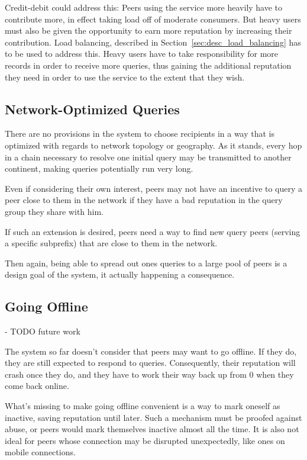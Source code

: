 Credit-debit could address this: Peers using the service more heavily have to
contribute more, in effect taking load off of moderate consumers. But heavy
users must also be given the opportunity to earn more reputation by increasing
their contribution. Load balancing, described in
Section~\ref{sec:desc_load_balancing} has to be used to address this. Heavy
users have to take responsibility for more records in order to receive more
queries, thus gaining the additional reputation they need in order to use the
service to the extent that they wish.

\subsection{Network-Optimized Queries}
There are no provisions in the system to choose recipients in a way that is
optimized with regards to network topology or geography. As it stands, every hop
in a chain necessary to resolve one initial query may be transmitted to another
continent, making queries potentially run very long.

Even if considering their own interest, peers may not have an incentive to query
a peer close to them in the network if they have a bad reputation in the query
group they share with him.

If such an extension is desired, peers need a way to find new query peers
(serving a specific subprefix) that are close to them in the network.

Then again, being able to spread out ones queries to a large pool of peers is a
design goal of the system, it actually happening a consequence.

\subsection{Going Offline}
- TODO future work

The system so far doesn't consider that peers may want to go offline. If they
do, they are still expected to respond to queries. Consequently, their
reputation will crash once they do, and they have to work their way back up from
0 when they come back online.

What's missing to make going offline convenient is a way to mark oneself as
inactive, saving reputation until later. Such a mechanism must be proofed
against abuse, or peers would mark themselves inactive almost all the time. It
is also not ideal for peers whose connection may be disrupted unexpectedly, like
ones on mobile connections.

